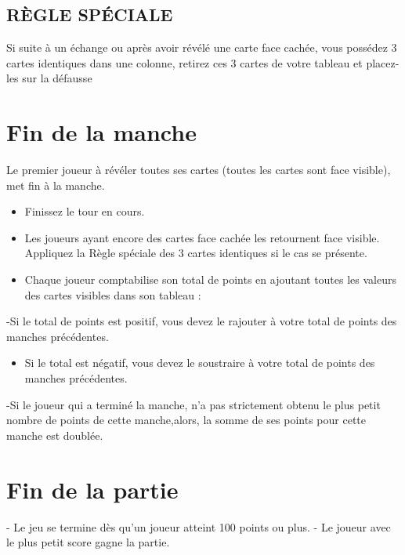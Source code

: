 \documentclass{article}%
\begin{document}
%
\subsection{ RÈGLE SPÉCIALE
}%
\label{subsec:RGLESPCIALE}%
Si suite à un échange ou après avoir révélé une carte face cachée, vous possédez 3 cartes identiques dans une colonne, retirez ces 3 cartes de votre tableau et placez{-}les sur la défausse


%
\section{ Fin de la manche
}%
\label{sec:Findelamanche}%
Le premier joueur à révéler toutes ses cartes (toutes les cartes sont face visible), met fin à la manche.
%
\begin{itemize}%
\item%
%
 Finissez le tour en cours.
%
\item%
%
 Les joueurs ayant encore des cartes face cachée les retournent face visible. Appliquez la Règle spéciale des 3 cartes identiques si le cas se présente.
%
\item%
%
 Chaque joueur comptabilise son total de points en ajoutant toutes les valeurs des cartes visibles dans son tableau :
%
\end{itemize}%
{-}Si le total de points est positif, vous devez le rajouter à votre total de points des manches précédentes.
%
\begin{itemize}%
\item%
%
 Si le total est négatif, vous devez le soustraire à votre total de points des manches précédentes.
%
\end{itemize}%
{-}Si le joueur qui a terminé la manche, n’a pas strictement obtenu le plus petit nombre de points de cette manche,alors, la somme de ses points pour cette manche est doublée.


%
\section{ Fin de la partie
}%
\label{sec:Findelapartie}%
{-} Le jeu se termine dès qu’un joueur atteint 100 points ou plus.
%
{-} Le joueur avec le plus petit score gagne la partie.

%
\end{document}
